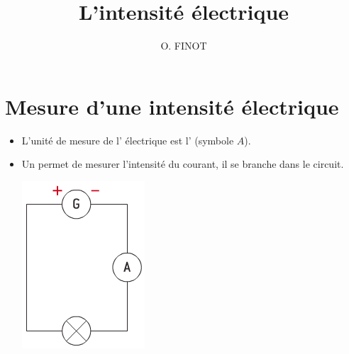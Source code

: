 \documentclass[xcolor={dvipsnames}]{beamer}
\title{L'intensité électrique}
\author{O. FINOT}\institute{Collège S$^t$ Bernard}
\begin{document}
\begin{frame}
  \titlepage 
\end{frame}

\section{Mesure d'une intensité électrique}



%
%			
%			
%			



\begin{frame}

\begin{alertblock}{}
	
	\begin{itemize}
		\item L'unité de mesure de l' électrique est l'  (symbole $A$). 
		
		\item Un  permet de mesurer l'intensité du courant, il se branche  dans le circuit.
		
		\begin{center}
			\includegraphics[scale=0.5]{../img/schema1}
		\end{center}
	\end{itemize}
	
	

\end{alertblock}
\end{frame}
\end{document}
